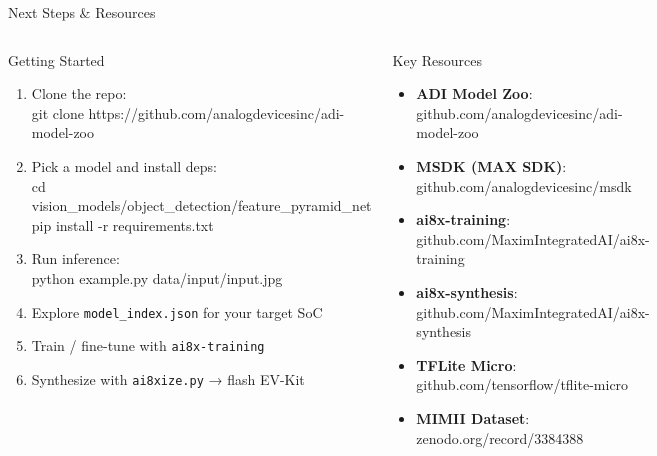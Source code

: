 \documentclass[aspectratio=169,10pt]{beamer}
\begin{document}
\begin{frame}{Next Steps \& Resources}
  \begin{columns}[T]
    \begin{block}{Getting Started}
      {\small
      \begin{enumerate}
        \item Clone the repo:\\
              {\ttfamily git clone https://github.com/analogdevicesinc/adi-model-zoo}
        \item Pick a model and install deps:\\
              {\ttfamily cd vision\_models/object\_detection/feature\_pyramid\_net}\\
              {\ttfamily pip install -r requirements.txt}
        \item Run inference:\\
              {\ttfamily python example.py data/input/input.jpg}
        \item Explore \texttt{model\_index.json} for your target SoC
        \item Train / fine-tune with \texttt{ai8x-training}
        \item Synthesize with \texttt{ai8xize.py} → flash EV-Kit
      \end{enumerate}}
    \end{block}

    \begin{block}{Key Resources}
      {\small
      \begin{itemize}
        \item \textbf{ADI Model Zoo}:\\
              {\ttfamily\scriptsize github.com/analogdevicesinc/adi-model-zoo}
        \item \textbf{MSDK (MAX SDK)}:\\
              {\ttfamily\scriptsize github.com/analogdevicesinc/msdk}
        \item \textbf{ai8x-training}:\\
              {\ttfamily\scriptsize github.com/MaximIntegratedAI/ai8x-training}
        \item \textbf{ai8x-synthesis}:\\
              {\ttfamily\scriptsize github.com/MaximIntegratedAI/ai8x-synthesis}
        \item \textbf{TFLite Micro}:\\
              {\ttfamily\scriptsize github.com/tensorflow/tflite-micro}
        \item \textbf{MIMII Dataset}:\\
              {\ttfamily\scriptsize zenodo.org/record/3384388}
      \end{itemize}}
    \end{block}
  \end{columns}


\end{frame}
\end{document}
